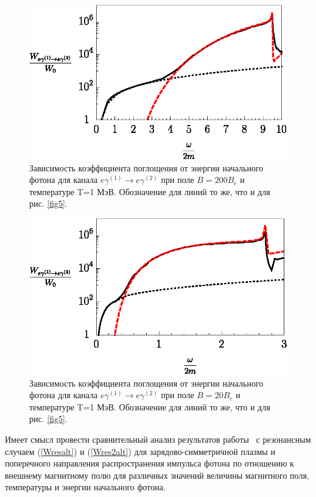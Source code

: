\documentclass[cp1251%
               ]{jetp} %
\begin{document}
\begin{figure}[t!]\centering
	\includegraphics[width=0.9\linewidth]{fig7.eps}
	\caption{Зависимость коэффициента поглощения от энергии начального фотона для канала $e\gamma^{(1)}\to e\gamma^{(2)}$ при поле $B=200 B_e$ и температуре T=1 МэВ. Обозначение для линий то же, что и для рис. \ref{fig5}.}
	\label{fig7}
\end{figure}
\begin{figure}[t!]\centering
	\includegraphics[width=0.9\linewidth]{fig8.eps}
	\caption{Зависимость коэффициента поглощения от энергии начального фотона для канала $e\gamma^{(1)}\to e\gamma^{(2)}$ при поле $B=20 B_e$ и температуре T=1 МэВ. Обозначение для линий то же, что и для рис. \ref{fig5}.}
	\label{fig8}
\end{figure}

Имеет смысл провести сравнительный анализ результатов работы~\cite{Chistyakov:2009}  с резонансным случаем (\ref{Wresalt}) и (\ref{Wres2alt}) для зарядово-симметричной плазмы и поперечного направления распространения импульса фотона по отношению к внешнему магнитному полю для различных значений величины магнитного поля, температуры и энергии начального фотона.
\end{document}
